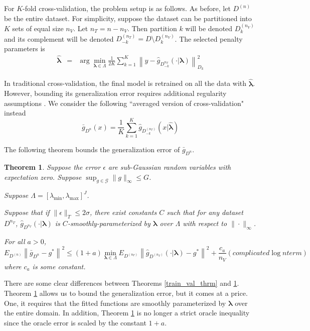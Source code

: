 \documentclass[12pt]{article}
\newtheorem{theorem}{Theorem}
\begin{document}
For $K$-fold cross-validation, the problem setup is as follows. As before, let $D^{(n)}$ be the entire dataset. For simplicity, suppose the dataset can be partitioned into $K$ sets of equal size $n_V$. Let $n_T = n - n_V$. Then partition $k$ will be denoted $D_k^{(n_V)}$ and its complement will be denoted $D_{-k}^{(n_T)} = D \setminus D_k^{(n_V)}$. The selected penalty parameters is
\begin{eqnarray}
\label{kfold_opt}
\hat{\boldsymbol \lambda} &=& \arg\min_{\boldsymbol{\lambda} \in\Lambda} \frac{1}{2K} \sum_{k=1}^K  \left \| y-\hat{g}_{D_{-k}^{n_T}}(\cdot | \boldsymbol \lambda) \right \|_{D_k}^{2}
\end{eqnarray}

In traditional cross-validation, the final model is retrained on all the data with $\hat{\boldsymbol{\lambda}}$. However, bounding its generalization error requires additional regularity assumptions \citep{lecue2012oracle}. We consider the following ``averaged version of cross-validation" instead
\begin{equation}
\bar{g}_{D^{n}}(x) = \frac{1}{K} \sum_{k=1}^K \hat{g}_{D^{(n_T)}_{-k}}
(x | \hat{\boldsymbol \lambda})
\end{equation}


The following theorem bounds the generalization error of $\bar{g}_{D^{n}}$.
\begin{theorem}
\label{thrm:kfold}
Suppose the error $\epsilon$ are sub-Gaussian random variables with expectation zero.
Suppose $\sup_{g \in \mathcal{G}} \|g\|_\infty \le G$.

Suppose $\Lambda = [\lambda_{\min}, \lambda_{\max}]^J$.

Suppose that if $\|\epsilon\|_{T}\le 2\sigma$, there exist constants $C$ such that for any dataset $D^{n_T}$, $\hat{g}_{D^{n_T}}(\cdot | \boldsymbol \lambda)$ is $C$-smoothly-parameterized by $\boldsymbol \lambda$ over $\Lambda$ with respect to $\| \cdot \|_\infty$.

For all $a > 0$,
\begin{equation}
E_{D^{(n)}} \left \| \bar{g}_{D^{n}} - g^* \right \|^2 \le
(1+a) \min_{\boldsymbol{\lambda} \in \Lambda}  E_{D^{(n_T)}} \left \| \hat{g}_{D^{(n_T)}}(\cdot |\boldsymbol \lambda) - g^* \right \|^2
+  \frac{c_a}{n_V} \left (complicated \log n term \right )
\end{equation}
where $c_a$ is some constant.
\end{theorem}

There are some clear differences between Theorems \ref{train_val_thrm} and \ref{thrm:kfold}. Theorem \ref{thrm:kfold} allows us to bound the generalization error, but it comes at a price. One, it requires that the fitted functions are smoothly parameterized by $\boldsymbol{\lambda}$ over the entire domain. In addition, Theorem \ref{thrm:kfold} is no longer a strict oracle inequality since the oracle error is scaled by the constant $1+a$.
\end{document}
